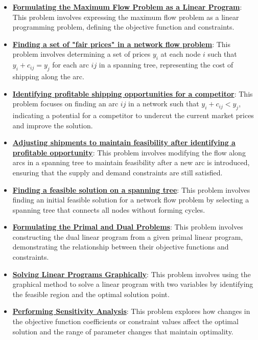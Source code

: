 \documentclass{article}%
\begin{document}
\begin{itemize}[leftmargin=*]
\item \href{https://www.math.purdue.edu/~yipn/421/2024-11-19-MaxFlowMinCut.pdf#page=14}{\textbf{Formulating the Maximum Flow Problem as a Linear Program}}: This problem involves expressing the maximum flow problem as a linear programming problem, defining the objective function and constraints.%
\item \href{https://www.math.purdue.edu/~yipn/421/2024-11-21-EconNetSimplex.pdf#page=4}{\textbf{Finding a set of "fair prices" in a network flow problem}}: This problem involves determining a set of prices  $y_i$ at each node $i$ such that $y_i + c_{ij} = y_j$ for each arc $ij$ in a spanning tree, representing the cost of shipping along the arc.%
\item \href{https://www.math.purdue.edu/~yipn/421/2024-11-21-EconNetSimplex.pdf#page=5}{\textbf{Identifying profitable shipping opportunities for a competitor}}: This problem focuses on finding an arc $ij$ in a network such that $y_i + c_{ij} < y_j$, indicating a potential for a competitor to undercut the current market prices and improve the solution.%
\item \href{https://www.math.purdue.edu/~yipn/421/2024-11-21-EconNetSimplex.pdf#page=6}{\textbf{Adjusting shipments to maintain feasibility after identifying a profitable opportunity}}: This problem involves modifying the flow along arcs in a spanning tree to maintain feasibility after a new arc is introduced, ensuring that the supply and demand constraints are still satisfied.%
\item \href{https://www.math.purdue.edu/~yipn/421/2024-11-21-EconNetSimplex.pdf#page=3}{\textbf{Finding a feasible solution on a spanning tree}}: This problem involves finding an initial feasible solution for a network flow problem by selecting a spanning tree that connects all nodes without forming cycles.%
\item \href{https://www.math.purdue.edu/~yipn/421/2024-12-03-Duality.pdf#page=1}{\textbf{Formulating the Primal and Dual Problems}}: This problem involves constructing the dual linear program from a given primal linear program, demonstrating the relationship between their objective functions and constraints.%
\item \href{https://www.math.purdue.edu/~yipn/421/2024-12-03-Duality.pdf#page=3}{\textbf{Solving Linear Programs Graphically}}: This problem involves using the graphical method to solve a linear program with two variables by identifying the feasible region and the optimal solution point.%
\item \href{https://www.math.purdue.edu/~yipn/421/2024-12-03-Duality.pdf#page=11}{\textbf{Performing Sensitivity Analysis}}: This problem explores how changes in the objective function coefficients or constraint values affect the optimal solution and the range of parameter changes that maintain optimality.%

\end{itemize}
\end{document}
